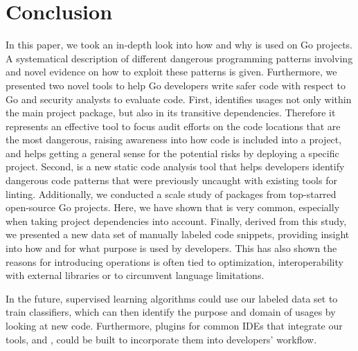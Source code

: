 \section{Conclusion}
\label{sec:concl}

In this paper, we took an in-depth look into how and why \unsafe{} is used on Go projects.
A systematical description of different dangerous programming patterns involving \unsafe{} and novel evidence on how to exploit these patterns is given.
Furthermore, we presented two novel tools to help Go developers write safer code with respect to \unsafe{} Go and security analysts to evaluate \unsafe{} code.
First, \toolUsage{} identifies \unsafe{} usages not only within the main project package, but also in its transitive dependencies. 
Therefore it represents an effective tool to focus audit efforts on the code locations that are the most dangerous, raising awareness into how \unsafe{} code is included into a project, and helps getting a general sense for the potential risks by deploying a specific project.
Second, \toolSA{} is a new static code analysis tool that helps developers identify dangerous code patterns that were previously uncaught with existing tools for linting.
Additionally, we conducted a scale study of \packagesAnalyzed{} packages from \projsAnalyzed{} top-starred open-source Go projects.
Here, we have shown that \unsafe{} is very common, especially when taking project dependencies into account. 
Finally, derived from this study, we presented a new data set of manually labeled code snippets, providing insight into how and for what purpose \unsafe{} is used by developers.
This has also shown the reasons for introducing \unsafe{} operations is often tied to optimization, interoperability with external libraries or to circumvent language limitations.

In the future, supervised learning algorithms could use our labeled data set to train classifiers, which can then identify the purpose and domain of \unsafe{} usages by looking at new code. 
Furthermore, plugins for common IDEs that integrate our tools, \toolUsage{} and \toolSA{}, could be built to incorporate them into developers' workflow.%